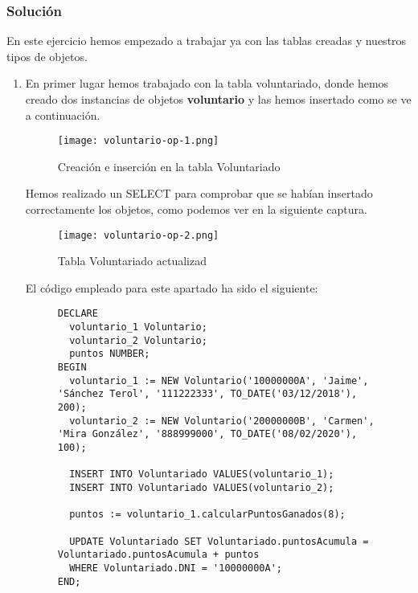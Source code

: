 \subsubsection{Solución}
En este ejercicio hemos empezado a trabajar ya con las tablas creadas y nuestros tipos de objetos.

\begin{enumerate}[label=\alph*)]
    \item En primer lugar hemos trabajado con la tabla voluntariado, donde hemos creado dos instancias de objetos \textbf{voluntario} y las hemos insertado como se ve a continuación.

    \begin{figure}[H]
        \centering
        \texttt{[image: voluntario-op-1.png]}
        \caption{Creación e inserción en la tabla Voluntariado}
    \end{figure}

    Hemos realizado un SELECT para comprobar que se habían insertado correctamente los objetos, como podemos ver en la siguiente captura.

    \begin{figure}[H]
        \centering
        \texttt{[image: voluntario-op-2.png]}
        \caption{Tabla Voluntariado actualizad}
    \end{figure}

    El código empleado para este apartado ha sido el siguiente:

    \begin{figure}[H]
        \begin{tcolorbox}[sharp corners, colback=yellow!30, colframe=white!20]
            \tiny
            \begin{verbatim}
DECLARE
  voluntario_1 Voluntario;
  voluntario_2 Voluntario;
  puntos NUMBER;
BEGIN
  voluntario_1 := NEW Voluntario('10000000A', 'Jaime', 'Sánchez Terol', '111222333', TO_DATE('03/12/2018'), 200);
  voluntario_2 := NEW Voluntario('20000000B', 'Carmen', 'Mira González', '888999000', TO_DATE('08/02/2020'), 100);

  INSERT INTO Voluntariado VALUES(voluntario_1);
  INSERT INTO Voluntariado VALUES(voluntario_2);

  puntos := voluntario_1.calcularPuntosGanados(8);

  UPDATE Voluntariado SET Voluntariado.puntosAcumula = Voluntariado.puntosAcumula + puntos
  WHERE Voluntariado.DNI = '10000000A';
END;
            \end{verbatim}
        \end{tcolorbox}
    \end{figure}


\end{enumerate}
